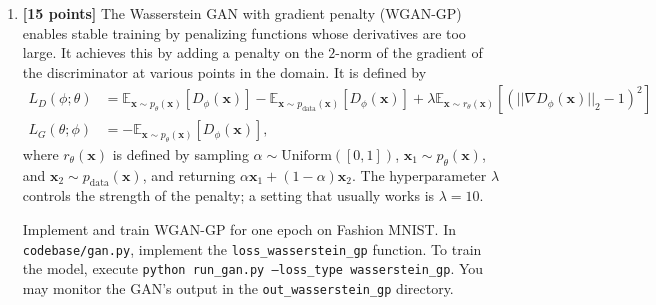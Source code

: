 \documentclass{article}
\newcommand{\bx}{{\boldsymbol{x}}}
\begin{document}
\begin{enumerate}
    \item \textbf{[15 points]} The Wasserstein GAN with gradient penalty (WGAN-GP) enables stable training by penalizing functions whose derivatives are too large. It achieves this by adding a penalty on the $2$-norm of the gradient of the discriminator at various points in the domain. It is defined by \begin{align*}
        L_D(\phi; \theta) &= \mathbb{E}_{\bx \sim p_\theta(\bx)}[D_\phi(\bx)] - \mathbb{E}_{\bx \sim p_\text{data}(\bx)}[D_\phi(\bx)] + \lambda \mathbb{E}_{\bx \sim r_\theta(\bx)} [(|| \nabla D_\phi(\bx) ||_2 - 1)^2] \\
        L_G(\theta; \phi) &= -\mathbb{E}_{\bx \sim p_\theta(\bx)}[D_\phi(\bx)],
    \end{align*} where $r_\theta(\bx)$ is defined by sampling $\alpha \sim \mathrm{Uniform}([0,1])$, $\bx_1 \sim p_\theta(\bx)$, and $\bx_2 \sim p_\text{data}(\bx)$, and returning $\alpha \bx_1 + (1 - \alpha )\bx_2$. The hyperparameter $\lambda$ controls the strength of the penalty; a setting that usually works is $\lambda = 10$.
    
    Implement and train WGAN-GP for one epoch on Fashion MNIST. In \texttt{codebase/gan.py}, implement the \texttt{loss\_wasserstein\_gp} function. To train the model, execute \texttt{python run\_gan.py --loss\_type wasserstein\_gp}. You may monitor the GAN's output in the \texttt{out\_wasserstein\_gp} directory.
\end{enumerate}
\end{document}
